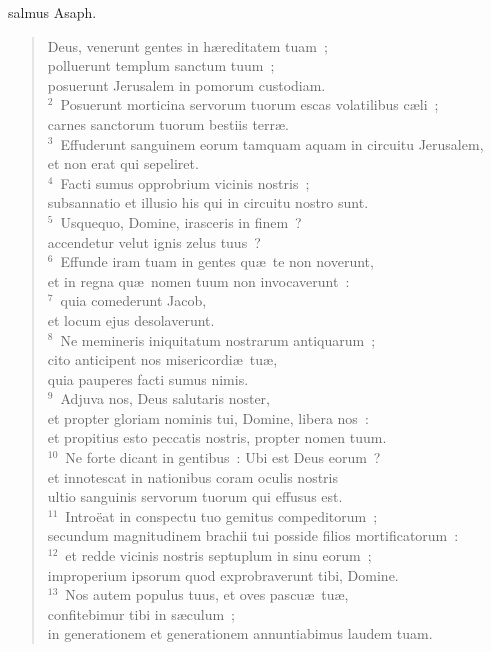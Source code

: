 \bchapter[Psalm]
salmus Asaph. \begin{verse}Deus, venerunt gentes in h\ae reditatem tuam~;\\ polluerunt templum sanctum tuum~;\\ posuerunt Jerusalem in pomorum custodiam.\\
${}^{2}$~Posuerunt morticina servorum tuorum escas volatilibus c\ae li~;\\ carnes sanctorum tuorum bestiis terr\ae .\\
${}^{3}$~Effuderunt sanguinem eorum tamquam aquam in circuitu Jerusalem,\\ et non erat qui sepeliret.\\
${}^{4}$~Facti sumus opprobrium vicinis nostris~;\\ subsannatio et illusio his qui in circuitu nostro sunt.\\
${}^{5}$~Usquequo, Domine, irasceris in finem~?\\ accendetur velut ignis zelus tuus~?\\
${}^{6}$~Effunde iram tuam in gentes qu\ae\ te non noverunt,\\ et in regna qu\ae\ nomen tuum non invocaverunt~:\\
${}^{7}$~quia comederunt Jacob,\\ et locum ejus desolaverunt.\\
${}^{8}$~Ne memineris iniquitatum nostrarum antiquarum~;\\ cito anticipent nos misericordi\ae\ tu\ae ,\\ quia pauperes facti sumus nimis.\\
${}^{9}$~Adjuva nos, Deus salutaris noster,\\ et propter gloriam nominis tui, Domine, libera nos~:\\ et propitius esto peccatis nostris, propter nomen tuum.\\
${}^{10}$~Ne forte dicant in gentibus~: Ubi est Deus eorum~?\\ et innotescat in nationibus coram oculis nostris\\ ultio sanguinis servorum tuorum qui effusus est.\\
${}^{11}$~Intro\"eat in conspectu tuo gemitus compeditorum~;\\ secundum magnitudinem brachii tui posside filios mortificatorum~:\\
${}^{12}$~et redde vicinis nostris septuplum in sinu eorum~;\\ improperium ipsorum quod exprobraverunt tibi, Domine.\\
${}^{13}$~Nos autem populus tuus, et oves pascu\ae\ tu\ae ,\\ confitebimur tibi in s\ae culum~;\\ in generationem et generationem annuntiabimus laudem tuam.\end{verse}




